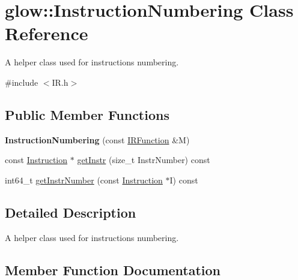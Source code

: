 \hypertarget{classglow_1_1_instruction_numbering}{}\section{glow\+:\+:Instruction\+Numbering Class Reference}
\label{classglow_1_1_instruction_numbering}


A helper class used for instructions numbering.  




{\ttfamily \#include $<$I\+R.\+h$>$}

\subsection*{Public Member Functions}
\begin{DoxyCompactItemize}
\item 
\mbox{\label{classglow_1_1_instruction_numbering_aee4473162534f2e0f0cf9ef5c5934e4f}} 
{\bfseries Instruction\+Numbering} (const \hyperlink{classglow_1_1_i_r_function}{I\+R\+Function} \&M)
\item 
const \hyperlink{classglow_1_1_instruction}{Instruction} $\ast$ \hyperlink{classglow_1_1_instruction_numbering_ad67ba4410eeb3e6f3ad8371c4c4b010a}{get\+Instr} (size\+\_\+t Instr\+Number) const
\item 
int64\+\_\+t \hyperlink{classglow_1_1_instruction_numbering_a7e2781897999a53f1181b2410c614ecc}{get\+Instr\+Number} (const \hyperlink{classglow_1_1_instruction}{Instruction} $\ast$I) const
\end{DoxyCompactItemize}


\subsection{Detailed Description}
A helper class used for instructions numbering. 

\subsection{Member Function Documentation}
\mbox{\label{classglow_1_1_instruction_numbering_ad67ba4410eeb3e6f3ad8371c4c4b010a}} 
